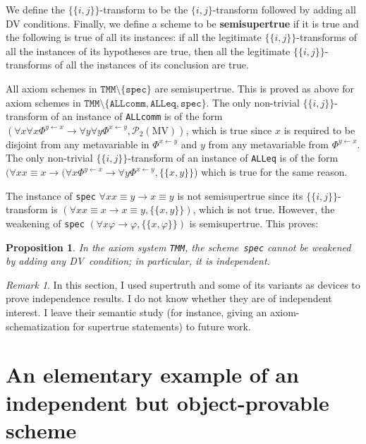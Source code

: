 \documentclass[11pt]{article}
\newcommand{\bb}[2]{\{\!\{ #1 , #2 \}\!\}}
\newcommand*{\define}[1]{\textbf{#1}}%
\renewcommand*{\phi}{\varphi}
\newcommand*{\calP}{\mathcal{P}}
\newcommand*{\MV}{\mathrm{MV}}
\theoremstyle{plain}
\newtheorem{proposition}[theorem]{Proposition}
\theoremstyle{definition}
\theoremstyle{remark}
\newtheorem{remark}[theorem]{Remark}
\begin{document}
We define the $\bb{i}{j}$-transform to be the $\{i, j\}$-transform followed by adding all
DV conditions.
Finally, we define a scheme to be \define{semisupertrue} if it is true and the following is true of
all its instances: if all the legitimate $\bb{i}{j}$-transforms of all the instances of its
hypotheses are true, then all the legitimate $\bb{i}{j}$-transforms of all the instances of
its conclusion are true.

All axiom schemes in $\texttt{TMM} \setminus \{\texttt{spec}\}$ are semisupertrue.
This is proved as above for axiom schemes in $\texttt{TMM} \setminus \{\texttt{ALLcomm}, \texttt{ALLeq}, \texttt{spec}\}$.
The only non-trivial $\bb{i}{j}$-transform of an instance of \texttt{ALLcomm} is of the form
$(\forall x \forall x \Phi^{y\leftarrow x} \to \forall y \forall y \Phi^{x\leftarrow y}, \calP_2(\MV))$,
which is true since $x$ is required to be disjoint from any metavariable in $\Phi^{x\leftarrow y}$
and $y$ from any metavariable from $\Phi^{y\leftarrow x}$.
The only non-trivial $\bb{i}{j}$-transform of an instance of \texttt{ALLeq} is of the form
$(\forall x x \equiv x \to (\forall x \Phi^{y \leftarrow x} \to \forall y \Phi^{x \leftarrow y},
\{\{x, y\}\}$) which is true for the same reason.


The instance of \texttt{spec} $\forall x x \equiv y \to x \equiv y$ is not semisupertrue since
its $\bb{i}{j}$-transform is $(\forall x x \equiv x \to x \equiv y, \{\{x, y\}\})$, which is not true.
However, the weakening of \texttt{spec} $(\forall x \phi \to \phi, \{\{x, \phi\}\})$ is semisupertrue.
This proves:

\begin{proposition}
\label{prop:spec}
In the axiom system \texttt{TMM}, the scheme~\texttt{spec} cannot
be weakened by adding any DV~condition; in particular, it is independent.
\end{proposition}



\begin{remark}
In this section, I used supertruth and some of its variants as devices to prove independence results.
I do not know whether they are of independent interest.
I leave their semantic study (for instance, giving an axiom-schematization for supertrue statements)
to future work.
\end{remark}



\appendix


\section{An elementary example of an independent but object-provable scheme}
\label{app:arithm}
\end{document}
